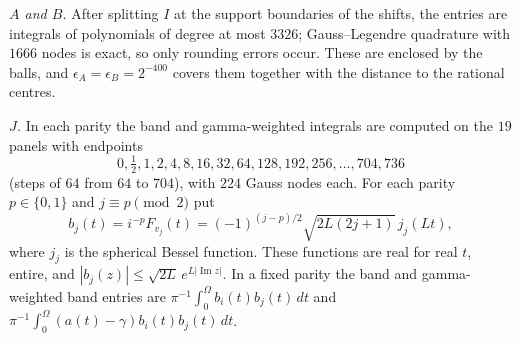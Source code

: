 \documentclass[11pt]{amsart}
\theoremstyle{remark}
\numberwithin{equation}{section}
\begin{document}
\emph{$A$ and $B$.} After splitting $I$ at the support boundaries of the shifts, the entries are integrals of polynomials of degree at most $3326$; Gauss--Legendre quadrature with $1666$ nodes is exact, so only rounding errors occur. These are enclosed by the balls, and $\epsilon_A=\epsilon_B=2^{-400}$ covers them together with the distance to the rational centres.

\emph{$J$.} In each parity the band and gamma-weighted integrals are computed on the $19$ panels with endpoints
\[
0,\tfrac12,1,2,4,8,16,32,64,128,192,256,\dots,704,736
\]
(steps of $64$ from $64$ to $704$), with $224$ Gauss nodes each. For each parity $p\in\{0,1\}$ and $j\equiv p\pmod2$ put
\[
b_j(t)=i^{-p}F_{v_j}(t)=(-1)^{(j-p)/2}\sqrt{2L(2j+1)}\,j_j(Lt),
\]
where $j_j$ is the spherical Bessel function. These functions are real for real $t$, entire, and $|b_j(z)|\le\sqrt{2L}\,e^{L|\operatorname{Im}z|}$. In a fixed parity the band and gamma-weighted band entries are $\pi^{-1}\int_0^\Omega b_i(t)b_j(t)\,dt$ and $\pi^{-1}\int_0^\Omega(a(t)-\gamma)b_i(t)b_j(t)\,dt$.
\end{document}
